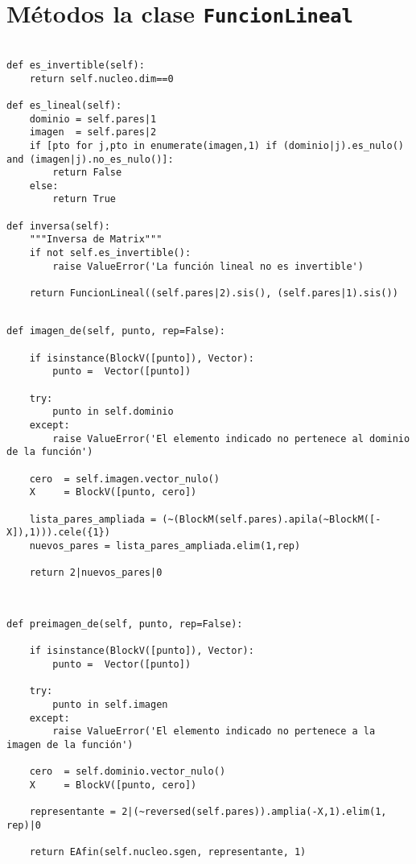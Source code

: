 \documentclass[11pt]{report}
\begin{document}
\section{Métodos la clase \texttt{FuncionLineal}}
\label{sec:org5da9030}
\begin{verbatim}

def es_invertible(self):
    return self.nucleo.dim==0

def es_lineal(self):
    dominio = self.pares|1 
    imagen  = self.pares|2
    if [pto for j,pto in enumerate(imagen,1) if (dominio|j).es_nulo() and (imagen|j).no_es_nulo()]:
        return False
    else:
        return True

def inversa(self):
    """Inversa de Matrix"""
    if not self.es_invertible():
        raise ValueError('La función lineal no es invertible')

    return FuncionLineal((self.pares|2).sis(), (self.pares|1).sis())
\end{verbatim}


\begin{verbatim}

def imagen_de(self, punto, rep=False):
    
    if isinstance(BlockV([punto]), Vector):
        punto =  Vector([punto])

    try:
        punto in self.dominio
    except:
        raise ValueError('El elemento indicado no pertenece al dominio de la función')

    cero  = self.imagen.vector_nulo()
    X     = BlockV([punto, cero])

    lista_pares_ampliada = (~(BlockM(self.pares).apila(~BlockM([-X]),1))).cele({1})
    nuevos_pares = lista_pares_ampliada.elim(1,rep)

    return 2|nuevos_pares|0
    
\end{verbatim}


\begin{verbatim}

def preimagen_de(self, punto, rep=False):
    
    if isinstance(BlockV([punto]), Vector):
        punto =  Vector([punto])
        
    try:
        punto in self.imagen
    except:
        raise ValueError('El elemento indicado no pertenece a la imagen de la función')

    cero  = self.dominio.vector_nulo()
    X     = BlockV([punto, cero])

    representante = 2|(~reversed(self.pares)).amplia(-X,1).elim(1, rep)|0
            
    return EAfin(self.nucleo.sgen, representante, 1) 
   
\end{verbatim}
\end{document}

